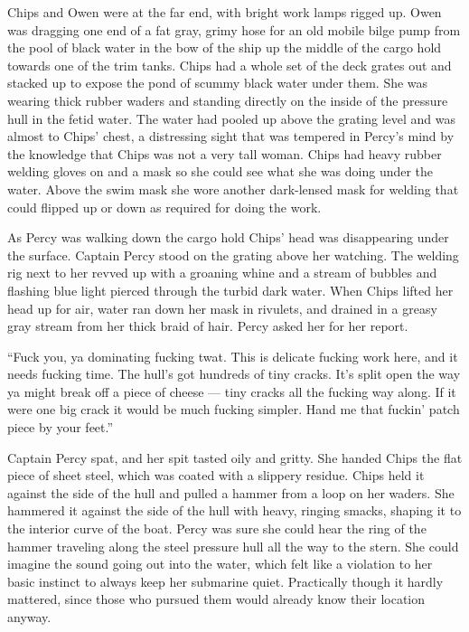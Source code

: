 \documentclass[
]{scrbook}
\begin{document}
Chips and Owen were at the far end, with bright work lamps rigged up.
Owen was dragging one end of a fat gray, grimy hose for an old mobile
bilge pump from the pool of black water in the bow of the ship up the
middle of the cargo hold towards one of the trim tanks. Chips had a
whole set of the deck grates out and stacked up to expose the pond of
scummy black water under them. She was wearing thick rubber waders and
standing directly on the inside of the pressure hull in the fetid water.
The water had pooled up above the grating level and was almost to Chips'
chest, a distressing sight that was tempered in Percy's mind by the
knowledge that Chips was not a very tall woman. Chips had heavy rubber
welding gloves on and a mask so she could see what she was doing under
the water. Above the swim mask she wore another dark-lensed mask for
welding that could flipped up or down as required for doing the work.

As Percy was walking down the cargo hold Chips' head was disappearing
under the surface. Captain Percy stood on the grating above her
watching. The welding rig next to her revved up with a groaning whine
and a stream of bubbles and flashing blue light pierced through the
turbid dark water. When Chips lifted her head up for air, water ran down
her mask in rivulets, and drained in a greasy gray stream from her thick
braid of hair. Percy asked her for her report.

``Fuck you, ya dominating fucking twat. This is delicate fucking work
here, and it needs fucking time. The hull's got hundreds of tiny cracks.
It's split open the way ya might break off a piece of cheese --- tiny
cracks all the fucking way along. If it were one big crack it would be
much fucking simpler. Hand me that fuckin' patch piece by your feet.''

Captain Percy spat, and her spit tasted oily and gritty. She handed
Chips the flat piece of sheet steel, which was coated with a slippery
residue. Chips held it against the side of the hull and pulled a hammer
from a loop on her waders. She hammered it against the side of the hull
with heavy, ringing smacks, shaping it to the interior curve of the
boat. Percy was sure she could hear the ring of the hammer traveling
along the steel pressure hull all the way to the stern. She could
imagine the sound going out into the water, which felt like a violation
to her basic instinct to always keep her submarine quiet. Practically
though it hardly mattered, since those who pursued them would already
know their location anyway.
\end{document}

